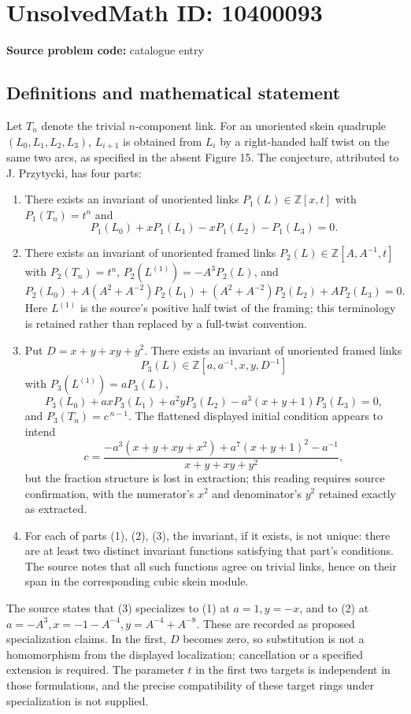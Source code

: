 \documentclass[11pt]{article}
\newcommand{\Z}{\mathbb{Z}}
\begin{document}
\section*{UnsolvedMath ID: 10400093}
\textbf{Source problem code:} catalogue entry
\subsection{Definitions and mathematical statement}
Let \(T_n\) denote the trivial \(n\)-component link. For an unoriented skein quadruple \((L_0,L_1,L_2,L_3)\), \(L_{i+1}\) is obtained from \(L_i\) by a right-handed half twist on the same two arcs, as specified in the absent Figure 15. The conjecture, attributed to J. Przytycki, has four parts:
\begin{enumerate}
\item There exists an invariant of unoriented links \(P_1(L)\in\Z[x,t]\) with \(P_1(T_n)=t^n\) and
\[P_1(L_0)+xP_1(L_1)-xP_1(L_2)-P_1(L_3)=0.\]
\item There exists an invariant of unoriented framed links \(P_2(L)\in\Z[A,A^{-1},t]\) with \(P_2(T_n)=t^n\), \(P_2(L^{(1)})=-A^3P_2(L)\), and
\[P_2(L_0)+A(A^2+A^{-2})P_2(L_1)+(A^2+A^{-2})P_2(L_2)+AP_2(L_3)=0.\]
Here \(L^{(1)}\) is the source's positive half twist of the framing; this terminology is retained rather than replaced by a full-twist convention.
\item Put \(D=x+y+xy+y^2\). There exists an invariant of unoriented framed links
\[P_3(L)\in\Z[a,a^{-1},x,y,D^{-1}]\]
with \(P_3(L^{(1)})=aP_3(L)\),
\[P_3(L_0)+axP_3(L_1)+a^2yP_3(L_2)-a^3(x+y+1)P_3(L_3)=0,\]
and \(P_3(T_n)=c^{\,n-1}\). The flattened displayed initial condition appears to intend
\[c=\frac{-a^3(x+y+xy+x^2)+a^7(x+y+1)^2-a^{-1}}{x+y+xy+y^2},\]
but the fraction structure is lost in extraction; this reading requires source confirmation, with the numerator's \(x^2\) and denominator's \(y^2\) retained exactly as extracted.
\item For each of parts (1), (2), (3), the invariant, if it exists, is not unique: there are at least two distinct invariant functions satisfying that part's conditions. The source notes that all such functions agree on trivial links, hence on their span in the corresponding cubic skein module.
\end{enumerate}
The source states that (3) specializes to (1) at \(a=1,y=-x\), and to (2) at \(a=-A^3,x=-1-A^{-4},y=A^{-4}+A^{-8}\). These are recorded as proposed specialization claims. In the first, \(D\) becomes zero, so substitution is not a homomorphism from the displayed localization; cancellation or a specified extension is required. The parameter \(t\) in the first two targets is independent in those formulations, and the precise compatibility of these target rings under specialization is not supplied.
\end{document}
